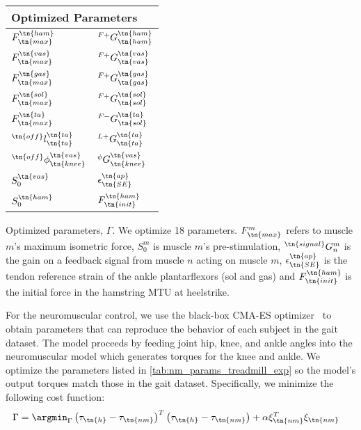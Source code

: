 \begin{margintable}    
    \centering
    \normalsize
    \begin{tabular}{ll}
        \multicolumn{2}{l}{Optimized Parameters} \\
        \midrule
        $F_\tn{max}^\tn{ham}$              & $^{F+}G_\tn{ham}^\tn{ham}$   \\
        $F_\tn{max}^\tn{vas}$              & $^{F+}G_\tn{vas}^\tn{vas}$   \\
        $F_\tn{max}^\tn{gas}$              & $^{F+}G_\tn{gas}^\tn{gas}$   \\
        $F_\tn{max}^\tn{sol}$              & $^{F+}G_\tn{sol}^\tn{sol}$   \\
        $F_\tn{max}^\tn{ta}$               & $^{F-}G_\tn{sol}^\tn{ta}$    \\
        $^\tn{off}l_\tn{ta}^\tn{ta}$       & $^{L+}G_\tn{ta}^\tn{ta}$     \\
        $^\tn{off}\phi_\tn{knee}^\tn{vas}$ & ${^\phi}G_\tn{knee}^\tn{vas}$ \\
        $S_0^\tn{vas}$                     & $\epsilon_\tn{SE}^\tn{ap}$   \\
        $S_0^\tn{ham}$                     & $F_\tn{init}^\tn{ham}$       \\
    \end{tabular}
    \caption[Parameters optimized for parameter set generation for experiment
    comparing neuromuscular and impedance control]{Optimized parameters,
    $\Gamma$. We optimize 18 parameters. $F_\tn{max}^m$ refers to muscle $m$'s
    maximum isometric force, $S_0^m$ is muscle $m$'s pre-stimulation,
    $^\tn{signal} G_n^m$ is the gain on a feedback signal from muscle $n$
    acting on muscle $m$, $\epsilon_\tn{SE}^\tn{ap}$ is the tendon reference
    strain of the ankle plantarflexors (sol and gas) and $F_\tn{init}^\tn{ham}$
    is the initial force in the hamstring MTU at
    heelstrike.}\label{tab:nm_params_treadmill_exp}
\end{margintable}
For the neuromuscular control, we use the black-box CMA-ES
optimizer~\citep{hansen2006cma} to obtain parameters that can reproduce the
behavior of each subject in the gait dataset. The model proceeds by feeding joint
hip, knee, and ankle angles into the neuromuscular model which generates torques
for the knee and ankle. We optimize the parameters listed in
\cref{tab:nm_params_treadmill_exp} so the model's output torques match those in
the gait dataset. Specifically, we minimize the following cost function:
\begin{align}
    \Gamma &= \argmin_\Gamma \left(\tau_\tn{h} - \tau_\tn{nm} \right)^T
    \left(\tau_\tn{h} - \tau_\tn{nm} \right) + \alpha \xi_\tn{nm}^T \xi_\tn{nm}
\end{align}
